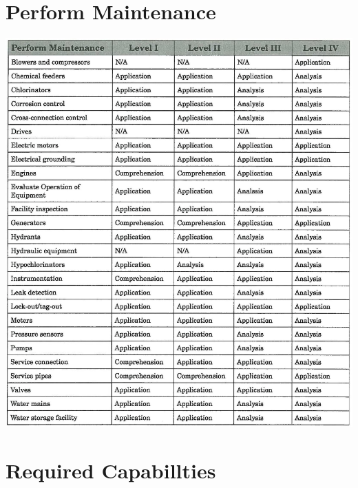 \documentclass[10pt]{article}
\begin{document}
\section{Perform Maintenance}
\includegraphics[max width=\textwidth]{2022_11_10_beeca89b60229885003dg-33}

\section{Required Capabillties}
\end{document}
